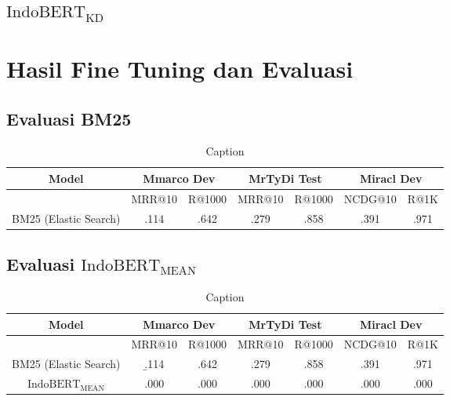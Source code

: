 \subsection{$\text{IndoBERT}_{\text{KD}}$}


\section{Hasil Fine Tuning dan Evaluasi}
\label{sec:hasil}

\subsection{Evaluasi BM25}
\label{sec:resultbm25}
    
\begin{table}[!ht]
    \centering
    \caption{Caption}
    \label{}
    \begin{tabular}{|c|cc|cc|cc|} \hline 
         Model&  \multicolumn{2}{|c|}{Mmarco Dev}& 
         \multicolumn{2}{|c|}{MrTyDi Test}&  \multicolumn{2}{|c|}{Miracl Dev}\\ \hline 
            & MRR@10 & R@1000 & MRR@10 & R@1000 & NCDG@10 & R@1K\\ \hline 
            BM25 (Elastic Search) & .114 & .642 & .279 & .858 & .391 & .971\\ \hline
            
    \end{tabular}
    
    
\end{table}

\subsection{Evaluasi $\text{IndoBERT}_{\text{MEAN}}$}
\label{sec:resultindobertmean}

\begin{table}[!ht]
    \centering
    \caption{Caption}
    \label{tab:indobertmean}
    \begin{tabular}{|c|cc|cc|cc|} \hline 
         Model&  \multicolumn{2}{|c|}{Mmarco Dev}& 
         \multicolumn{2}{|c|}{MrTyDi Test}&  \multicolumn{2}{|c|}{Miracl Dev}\\ \hline 
            & MRR@10 & R@1000 & MRR@10 & R@1000 & NCDG@10 & R@1K\\ \hline 
            BM25 (Elastic Search) & \b{.114} & .642 & .279 & .858 & .391 & .971\\ \hline
            $\text{IndoBERT}_{\text{MEAN}}$ & .000 & .000 & .000 & .000 & .000 & .000\\ \hline
    \end{tabular}
\end{table}


